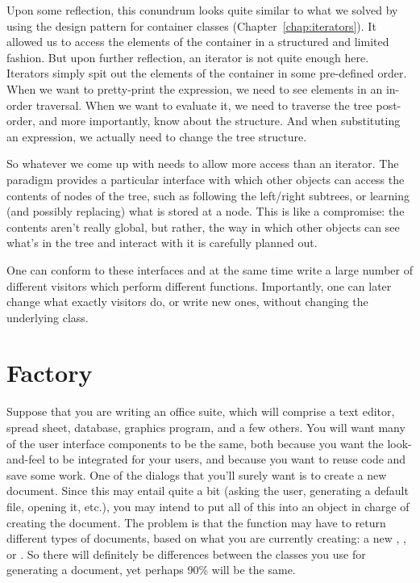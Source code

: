 Upon some reflection, this conundrum looks quite similar to what we
solved by using the  design pattern for container
classes (Chapter~\ref{chap:iterators}). 
It allowed us to access the elements of the container in a
structured and limited fashion. But upon further reflection, an
iterator is not quite enough here. 
Iterators simply spit out the elements of the container in some
pre-defined order. When we want to pretty-print the expression, we
need to see elements in an in-order traversal. When we want to
evaluate it, we need to traverse the tree post-order, and more
importantly, know about the structure.
And when substituting an expression, we actually need to change the
tree structure.

So whatever we come up with needs to allow more access than an
iterator. The  paradigm provides a particular interface
with which other objects can access the contents of nodes of the tree,
such as following the left/right subtrees, or learning (and possibly
replacing) what is stored at a node. This is like a compromise: the
contents aren't really global, but rather, the way in which other
objects can see what's in the tree and interact with it is carefully
planned out. 

One can conform to these interfaces and at the same time write a large
number of different visitors which perform different functions.
Importantly, one can later change what exactly visitors do, or write
new ones, without changing the underlying  class.

\section{Factory}
Suppose that you are writing an office suite, which will comprise a
text editor, spread sheet, database, graphics program, and a few
others. You will want many of the user interface components to be the
same, both because you want the look-and-feel to be integrated for
your users, and because you want to reuse code and save some work.
One of the dialogs that you'll surely want is to create a new
document. Since this may entail quite a bit (asking the user,
generating a default file, opening it, etc.), you may intend to put
all of this into an object in charge of creating the document.
The problem is that the  function may have to
return different types of documents, based on what you are currently
creating: a new , ,
 or . So there will
definitely be differences between the classes you use for generating a
document, yet perhaps 90\% will be the same.

